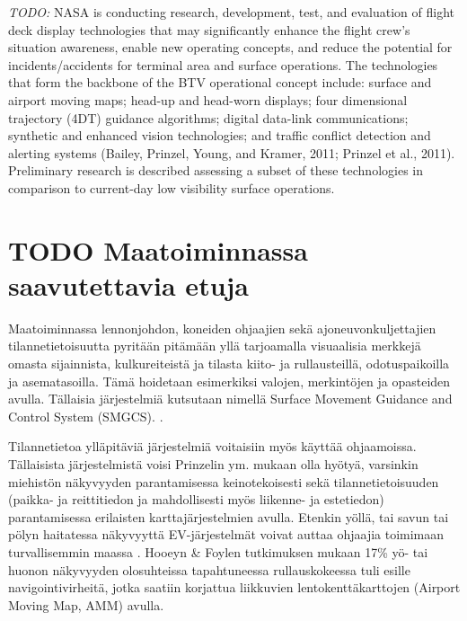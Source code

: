 \documentclass[utf8,bachelor,manualbib]{gradu3}
\begin{document}
\emph{TODO:}
NASA is conducting research, development, test, and evaluation of flight deck display technologies that may significantly enhance the flight crew's situation awareness, enable new operating concepts, and reduce the potential for incidents/accidents for terminal area and surface operations. The technologies that form the backbone of the BTV operational concept include: surface and airport moving maps; head-up and head-worn displays; four dimensional trajectory (4DT) guidance algorithms; digital data-link communications; synthetic and enhanced vision technologies; and traffic conflict detection and alerting systems (Bailey, Prinzel, Young, and Kramer, 2011; Prinzel et al., 2011). Preliminary research is described assessing a subset of these technologies in comparison to current-day low visibility surface operations. \citep{prinzel2013}











































\section{TODO Maatoiminnassa saavutettavia etuja}

Maatoiminnassa lennonjohdon, koneiden ohjaajien sekä ajoneuvonkuljettajien tilannetietoisuutta pyritään pitämään yllä tarjoamalla visuaalisia merkkejä omasta sijainnista, kulkureiteistä ja tilasta kiito- ja rullausteillä, odotuspaikoilla ja asematasoilla. Tämä hoidetaan esimerkiksi valojen, merkintöjen ja opasteiden avulla. Tällaisia järjestelmiä kutsutaan nimellä Surface Movement Guidance and Control System (SMGCS). \citep{prinzel2013}.

Tilannetietoa ylläpitäviä järjestelmiä voitaisiin myös käyttää ohjaamoissa. Tällaisista järjestelmistä voisi Prinzelin ym. \citeyearpar{prinzel2013} mukaan olla hyötyä, varsinkin miehistön näkyvyyden parantamisessa keinotekoisesti sekä tilannetietoisuuden (paikka- ja reittitiedon ja mahdollisesti myös liikenne- ja estetiedon) parantamisessa erilaisten karttajärjestelmien avulla. Etenkin yöllä, tai savun tai pölyn haitatessa näkyvyyttä EV-järjestelmät voivat auttaa ohjaajia toimimaan turvallisemmin maassa \citep{prinzel2013}. Hooeyn \& Foylen \citeyearpar{hooey2007} tutkimuksen mukaan 17\% yö- tai huonon näkyvyyden olosuhteissa tapahtuneessa rullauskokeessa tuli esille navigointivirheitä, jotka saatiin korjattua liikkuvien lentokenttäkarttojen (Airport Moving Map, AMM) avulla.
\end{document}
